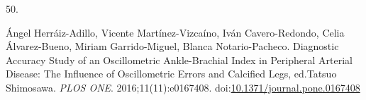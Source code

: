 \documentclass[
  12pt,
  letterpaper,
  openany,
  oneside]{book}
\newlength{\cslhangindent}
\newlength{\csllabelwidth}
\newenvironment{CSLReferences}[2] %
 {\begin{list}{}{%
  \setlength{\itemindent}{0pt}
  \setlength{\leftmargin}{0pt}
  \setlength{\parsep}{0pt}
  \ifodd #1
   \setlength{\leftmargin}{\cslhangindent}
   \setlength{\itemindent}{-1\cslhangindent}
  \fi
  \setlength{\itemsep}{#2\baselineskip}}}
 {\end{list}}
\newcommand{\CSLLeftMargin}[1]{\parbox[t]{\csllabelwidth}{\strut#1\strut}}
\newcommand{\CSLRightInline}[1]{\parbox[t]{\linewidth - \csllabelwidth}{\strut#1\strut}}
\begin{document}
\begin{CSLReferences}{0}{1}
\CSLLeftMargin{50. }%
\CSLRightInline{Ángel Herráiz-Adillo, Vicente Martínez-Vizcaíno, Iván
Cavero-Redondo, Celia Álvarez-Bueno, Miriam Garrido-Miguel, Blanca
Notario-Pacheco. Diagnostic {Accuracy} {Study} of an {Oscillometric}
{Ankle}-{Brachial} {Index} in {Peripheral} {Arterial} {Disease}: {The}
{Influence} of {Oscillometric} {Errors} and {Calcified} {Legs},
ed.Tatsuo Shimosawa. \emph{PLOS ONE}. 2016;11(11):e0167408.
doi:\href{https://doi.org/10.1371/journal.pone.0167408}{10.1371/journal.pone.0167408}}

\end{CSLReferences}


\backmatter
\end{document}
